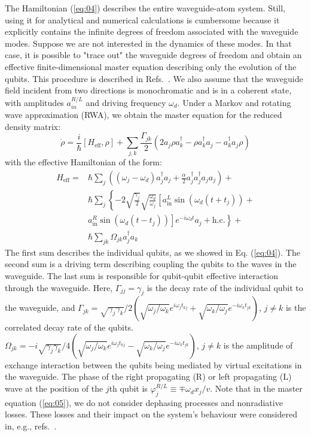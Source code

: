 \documentclass[lettersize,journal]{IEEEtran}
\begin{document}
The Hamiltonian (\ref{eq:04}) describes the entire waveguide-atom system. Still, using it for analytical and numerical calculations is cumbersome because it explicitly contains the infinite degrees of freedom associated with the waveguide modes.
Suppose we are not interested in the dynamics of these modes. 
In that case, it is possible to "trace out" the waveguide degrees of freedom and obtain an effective finite-dimensional master equation describing only the evolution of the qubits. 
This procedure is described in Refs.~\cite{gardiner2004quantum,lehmberg_radiation_1970,lalumiere_input-output_2013}. 
We also assume that the waveguide field incident from two directions is monochromatic and is in a coherent state, with amplitudes $a_{in}^{R/L}$ and driving frequency $\omega_d$. 
Under a Markov and rotating wave approximation (RWA), we obtain the master equation for the reduced density matrix:
\begin{equation} \label{eq:05}
    \dot{\rho} = \frac{i}{\hbar} \left[ H_\mathrm{eff}, \rho \right] + \sum_{j,k} \frac{\Gamma_{jk}}{2} \left( 2 a_j \rho a_k^\dag - \rho a_k^\dag a_j - a_k^\dag a_j \rho \right)
\end{equation}
with the effective Hamiltonian of the form:
\begin{align} \label{eq:06}
    H_\mathrm{eff} =& \hbar \sum_j \left( (\omega_j - \omega_d) a_j^\dag a_j + \frac{\alpha}{2} a_j^\dag a_j^\dag a_j a_j \right) + \nonumber \\
    &\hbar \sum_j \left\{ -2 \sqrt{\frac{\gamma_j}{2}} \sqrt{\frac{\omega_d}{\omega_j}} \left[ a_\mathrm{in}^L \sin(\omega_d (t + t_j)) + \right.\right.\\
    &\left.\left.a_\mathrm{in}^R \sin(\omega_d (t - t_j)) \right] e^{-i \omega_d t} a_j + \mathrm{h.c.} \right\} + \nonumber \\
    &\hbar \sum_{jk} \Omega_{jk} a_j^\dag a_k \nonumber
\end{align}
The first sum describes the individual qubits, as we showed in Eq. (\ref{eq:04}).
The second sum is a driving term describing coupling the qubits to the waves in the waveguide.
The last sum is responsible for qubit-qubit effective interaction through the waveguide.
Here, $\Gamma_{jj} = \gamma_j$ is the decay rate of the individual qubit to the waveguide, and $\Gamma_{jk} = \sqrt{\gamma_j \gamma_k}/2 \left( \sqrt{\omega_j / \omega_k} e^{i \omega_j t_{kj}} +  \sqrt{\omega_k / \omega_j} e^{-i \omega_k t_{jk}}\right)$, $j\neq k$ is the correlated decay rate of the qubits.
$\Omega_{jk} = -i\sqrt{\gamma_j \gamma_k}/4 \left( \sqrt{\omega_j / \omega_k} e^{i \omega_j t_{kj}} -  \sqrt{\omega_k / \omega_j} e^{-i \omega_k t_{jk}} \right)$, $j\neq k$ is the amplitude of exchange interaction between the qubits being mediated by virtual excitations in the waveguide.
The phase of the right propagating (R) or left propagating (L) wave at the position of the $j$th qubit is $\varphi_j^{R/L} \equiv \mp \omega_d x_j / v$.
Note that in the master equation (\ref{eq:05}), we do not consider dephasing processes and nonradiative losses. 
These losses and their impact on the system's behaviour were considered in, e.g., refs.~\cite{rosario_hamann_rectangular_2019, Nefedkin2022}.
\end{document}
